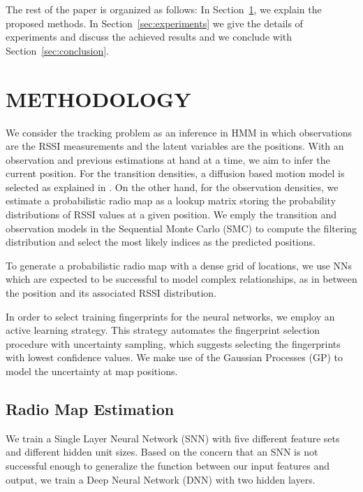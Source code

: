 \documentclass{article}
\begin{document}
	
	The rest of the paper is organized as follows: In Section~\ref{sec:methodology}, we explain the proposed methods. In Section~\ref{sec:experiments} we give the details of experiments and discuss the achieved results and we conclude with Section~\ref{sec:conclusion}.
	
	\section{METHODOLOGY}
	\label{sec:methodology}
	We consider the tracking problem as an inference in HMM \cite{barberBRML2012} in which observations are the RSSI measurements and the latent variables are the positions. With an observation and previous estimations at hand at a time, we aim to infer the current position. For the transition densities, a diffusion based motion model is selected as explained in \cite{Ser2017}. On the other hand, for the observation densities, we estimate a probabilistic radio map as a lookup matrix storing the probability distributions of RSSI values at a given position. We emply the transition and observation models in the Sequential Monte Carlo (SMC) to compute the filtering distribution and select the most likely indices as the predicted positions.
	
	To generate a probabilistic radio map with a dense grid of locations, we use NNs which are expected to be successful to model complex relationships, as in between the position and its associated RSSI distribution.
	
	In order to select training fingerprints for the neural networks, we employ an active learning strategy. %
	This strategy automates the fingerprint selection procedure with uncertainty sampling, which suggests selecting the fingerprints with lowest confidence values. We make use of the Gaussian Processes (GP) to model the uncertainty at map positions.
	
	\subsection{Radio Map Estimation}
	We train a Single Layer Neural Network (SNN) with five different feature sets and different hidden unit sizes. Based on the concern that an SNN is not successful enough to generalize the function between our input features and output, we train a Deep Neural Network (DNN) with two hidden layers.
		
\end{document}
